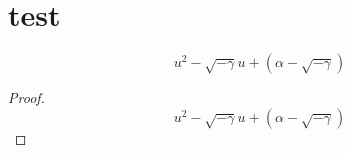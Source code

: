 \documentclass{fancybook}
\begin{document}
\chapter{test}

\begin{equation}
u^2 - \sqrt{-\gamma}u + \left(\alpha - \sqrt{-\gamma}\right)
\end{equation}
\begin{proof}
\begin{equation}
u^2 - \sqrt{-\gamma}u + \left(\alpha - \sqrt{-\gamma}\right)
\end{equation}
\end{proof}
\end{document}

